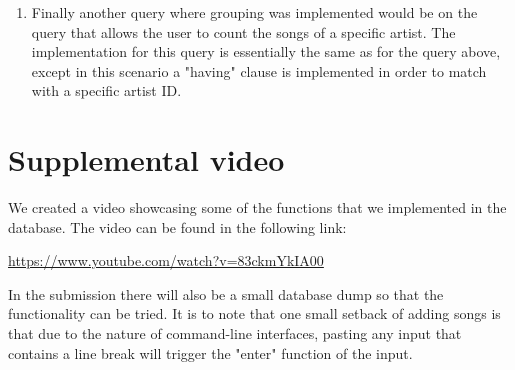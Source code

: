 \documentclass[a4paper,12pt]{article}
\begin{document}
\begin{enumerate}
	\item Finally another query where grouping was implemented would be on the query that allows the user to count the songs of a specific artist. The implementation for this query is essentially the same as for the query above, except in this scenario a "having" clause is implemented in order to match with a specific artist ID.
\end{enumerate}

\section{Supplemental video}

We created a video showcasing some of the functions that we implemented in the database. The video can be found in the following link:

\url{https://www.youtube.com/watch?v=83ckmYkIA00}

In the submission there will also be a small database dump so that the functionality can be tried. It is to note that one small setback of adding songs is that due to the nature of command-line interfaces, pasting any input that contains a line break will trigger the "enter" function of the input.
\end{document}

